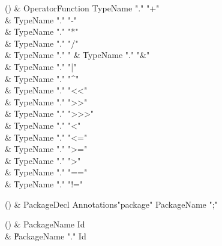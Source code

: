 \begin{bbgrammarappendix}

() & OperatorFunction \label{prod:OperatorFunction}  \: TypeName \xcd"." \xcd"+"  \\

 &    \| TypeName \xcd"." \xcd"-" \\
 &    \| TypeName \xcd"." \xcd"*" \\
 &    \| TypeName \xcd"." \xcd"/" \\
 &    \| TypeName \xcd"." \xcd"%
 &    \| TypeName \xcd"." \xcd"&" \\
 &    \| TypeName \xcd"." \xcd"|" \\
 &    \| TypeName \xcd"." \xcd"^" \\
 &    \| TypeName \xcd"." \xcd"<<" \\
 &    \| TypeName \xcd"." \xcd">>" \\
 &    \| TypeName \xcd"." \xcd">>>" \\
 &    \| TypeName \xcd"." \xcd"<" \\
 &    \| TypeName \xcd"." \xcd"<=" \\
 &    \| TypeName \xcd"." \xcd">=" \\
 &    \| TypeName \xcd"." \xcd">" \\
 &    \| TypeName \xcd"." \xcd"==" \\
 &    \| TypeName \xcd"." \xcd"!=" \\

\end{bbgrammarappendix}

\begin{bbgrammarappendix}

() & PackageDecl \label{prod:PackageDecl}  \: Annotations\opt \xcd"package" PackageName \xcd";"  \\


\end{bbgrammarappendix}

\begin{bbgrammarappendix}

() & PackageName \label{prod:PackageName}  \: Id  \\

 &    \| PackageName \xcd"." Id \\

\end{bbgrammarappendix}

